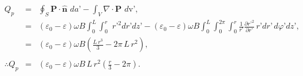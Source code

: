 \begin{example}
\begin{eqnarray}
Q_p&=&\oint_S\textbf{P}\cdot\hat{\textbf{n}}\,\,da\textbf{'}-\int_V\nabla\cdot\textbf{P}\,\,d\mbox{v}\textbf{'},\nonumber\\
&=&(\varepsilon_0-\varepsilon)\omega B\int_{0}^{L}\int_{0}^{r}\,\,r\textbf{'}^2dr\textbf{'}dz\textbf{'}-(\varepsilon_0-\varepsilon)\omega B\int_{0}^{L}\int_{0}^{2\pi}\int_{0}^{r}\frac{1}{r\textbf{'}}\frac{\partial r\textbf{'}^2}{\partial r\textbf{'}}\,r\textbf{'}dr\textbf{'}\,d\varphi\textbf{'}dz\textbf{'},\nonumber\\
&=&(\varepsilon_0-\varepsilon)\omega B\left(\frac{L\,r^3}{3}-2\pi \,L\,r^2 \right), \nonumber\\
\nonumber\\
\therefore Q_p&=&(\varepsilon_0-\varepsilon)\omega B\,L\,r^2\left(\frac{r}{3}-2\pi\right).
\end{eqnarray}
\end{example}




